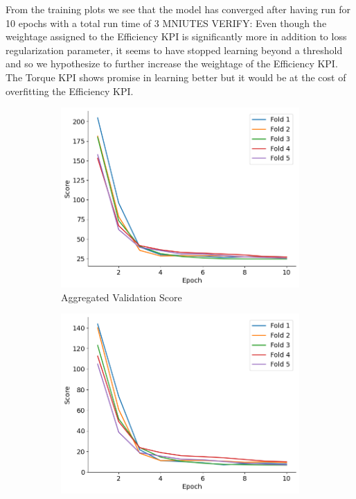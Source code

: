 \documentclass{report} %
\begin{document}
From the training plots we see that the model has converged after having run for 10 epochs with a total run time of 3 MNIUTES VERIFY:
Even though the weightage assigned to the Efficiency \ac{KPI} is significantly more in addition to loss regularization parameter, it seems to have stopped learning 
beyond a threshold and so we hypothesize to further increase the weightage of the Efficiency \ac{KPI}.
The Torque \ac{KPI} shows promise in learning better but it would be at the cost of overfitting the Efficiency \ac{KPI}.
\begin{figure}[H]
    \centering
    \begin{subfigure}{0.32\textwidth}
        \centering
        \includegraphics[width=\textwidth]{./ReportImages/val_score.png}
        \caption{\centering Aggregated Validation Score}
        \label{fig:Aggregated Validation Score}
    \end{subfigure}\hfill
    \begin{subfigure}{0.32\textwidth}
        \centering
        \includegraphics[width=\textwidth]{./ReportImages/val_score_y1.png}

\end{subfigure}
\end{figure}
\end{document}
